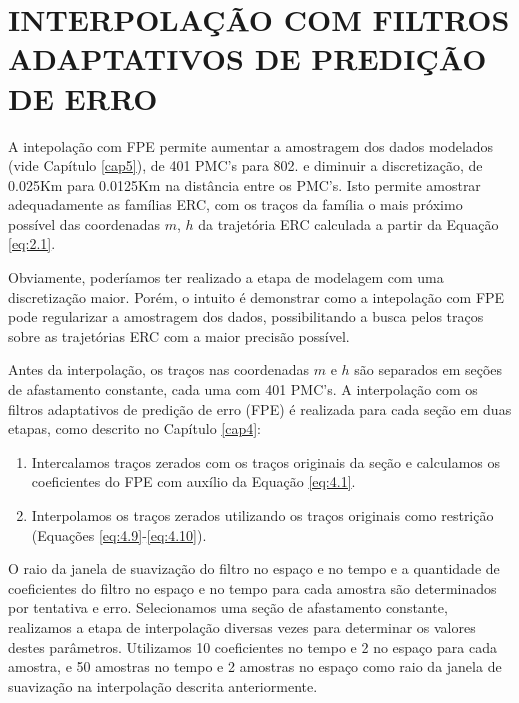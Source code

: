 %
% 
% 
% 
% 
% 
% 

\chapter{INTERPOLAÇÃO COM FILTROS ADAPTATIVOS DE PREDIÇÃO DE ERRO}
\label{cap6}

A intepolação com FPE permite aumentar a amostragem dos dados modelados (vide Capítulo \ref{cap5}), de 401 PMC's para 802.
e diminuir a discretização, de 0.025Km para 0.0125Km na distância entre os PMC's.
Isto permite amostrar adequadamente as famílias ERC, com os traços da família o mais próximo possível
das coordenadas $m$, $h$ da trajetória ERC calculada a partir da Equação \ref{eq:2.1}.

Obviamente, poderíamos ter realizado a etapa de modelagem com uma discretização maior. Porém, o intuito é demonstrar como
a intepolação com FPE pode regularizar a amostragem dos dados, possibilitando a busca pelos
traços sobre as trajetórias ERC com a maior precisão possível.

Antes da interpolação, os traços nas coordenadas $m$ e $h$ são separados em seções de afastamento constante, 
cada uma com 401 PMC's.
A interpolação com os filtros adaptativos de predição de erro (FPE) é realizada para cada seção em duas etapas,
como descrito no Capítulo \ref{cap4}:

\begin{enumerate}
 \item Intercalamos traços zerados com os traços originais da seção e calculamos os coeficientes do FPE
 com auxílio da Equação \ref{eq:4.1}.
 
 \item Interpolamos os traços zerados utilizando os traços originais como restrição (Equações \ref{eq:4.9}-\ref{eq:4.10}).
\end{enumerate}

O raio da janela de suavização do filtro no espaço e no tempo e a quantidade de coeficientes do filtro no espaço e no
tempo para cada amostra são determinados por tentativa e erro. Selecionamos uma seção de afastamento constante, realizamos a
etapa de interpolação diversas vezes para determinar os valores destes parâmetros. Utilizamos 10 coeficientes no tempo e 2 no
espaço para cada amostra, e 50 amostras no tempo e 2 amostras no espaço como raio da janela de suavização na interpolação descrita
anteriormente.

